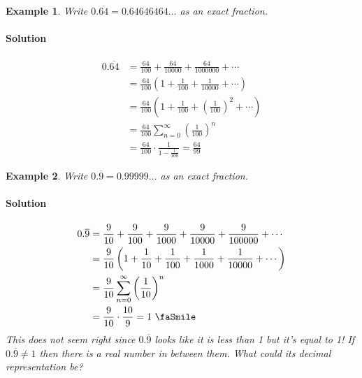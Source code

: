\documentclass[letterpaper, 11pt, openany]{book}
\theoremstyle{mytheoremstyle}
\theoremstyle{myexamplestyle}
\newtheorem{example}{Example}[section]
\newenvironment{solution}{\paragraph{\sffamily \smaller \fontseries{b}\selectfont Solution}}{\hfill\faSquare}
\begin{document}
\begin{example}\label{e:seriesdectofrac}
    Write $0.\overline{64} = 0.64646464\ldots$ as an exact fraction.
    
    \begin{solution}
        \begin{align*}
            0.\overline{64} &= \frac{64}{100} + \frac{64}{10000} + \frac{64}{1000000} + \cdots \\
                            &= \frac{64}{100} \left( 1 + \frac{1}{100} + \frac{1}{10000} + \cdots \right)\\
                            &= \frac{64}{100} \left( 1 + \frac{1}{100} + \left( \frac{1}{100} \right)^{2} + \cdots \right) \\
                            &= \frac{64}{100} \sum_{n=0}^{\infty} \left( \frac{1}{100} \right)^{n}\\
                            &= \frac{64}{100} \cdot \frac{1}{1-\frac{1}{100}} = \frac{64}{99}
        \end{align*}
    \end{solution}
\end{example}

\begin{example}\label{e:seriesdectofrac1}
    Write $0.\overline{9} = 0.99999\ldots$ as an exact fraction.
    
    \begin{solution}
        \begin{align*}
            0.\overline{9}  &= \frac{9}{10} + \frac{9}{100} + \frac{9}{1000} + \frac{9}{10000} + \frac{9}{100000} + \cdots\\
                            &= \frac{9}{10} \left( 1 + \frac{1}{10} + \frac{1}{100} + \frac{1}{1000} + \frac{1}{10000} + \cdots \right)\\
                            &= \frac{9}{10} \sum_{n=0}^{\infty} \left( \frac{1}{10} \right)^{n}\\
                            &= \frac{9}{10} \cdot \frac{10}{9} = 1 \text{ \faSmile}
         \end{align*}
         This does not seem right since $0.\overline{9}$ looks like it is less than 1 but it's equal to 1! If $0.\overline{9} \neq 1$ then there is a real number in between them. What could its decimal representation be? \faSmile
    \end{solution}
\end{example}
\end{document}
